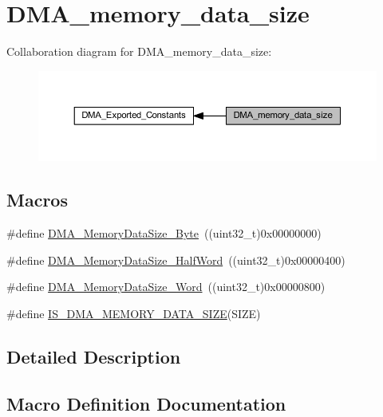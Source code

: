 \hypertarget{group___d_m_a__memory__data__size}{}\section{D\+M\+A\+\_\+memory\+\_\+data\+\_\+size}
\label{group___d_m_a__memory__data__size}
Collaboration diagram for D\+M\+A\+\_\+memory\+\_\+data\+\_\+size\+:
\nopagebreak
\begin{figure}[H]
\begin{center}
\leavevmode
\includegraphics[width=350pt]{group___d_m_a__memory__data__size}
\end{center}
\end{figure}
\subsection*{Macros}
\begin{DoxyCompactItemize}
\item 
\#define \hyperlink{group___d_m_a__memory__data__size_gad6093bccb60ff9adf81e21c73c58ba17}{D\+M\+A\+\_\+\+Memory\+Data\+Size\+\_\+\+Byte}~((uint32\+\_\+t)0x00000000)
\item 
\#define \hyperlink{group___d_m_a__memory__data__size_ga74c9b4e547f5eaaf35d4fd3d01ed5741}{D\+M\+A\+\_\+\+Memory\+Data\+Size\+\_\+\+Half\+Word}~((uint32\+\_\+t)0x00000400)
\item 
\#define \hyperlink{group___d_m_a__memory__data__size_gaff403722a6f82d4b34c9ef306507bb98}{D\+M\+A\+\_\+\+Memory\+Data\+Size\+\_\+\+Word}~((uint32\+\_\+t)0x00000800)
\item 
\#define \hyperlink{group___d_m_a__memory__data__size_gac9e3748cebcb16d4ae4206d562bc804c}{I\+S\+\_\+\+D\+M\+A\+\_\+\+M\+E\+M\+O\+R\+Y\+\_\+\+D\+A\+T\+A\+\_\+\+S\+I\+ZE}(S\+I\+ZE)
\end{DoxyCompactItemize}


\subsection{Detailed Description}


\subsection{Macro Definition Documentation}
\mbox{\label{group___d_m_a__memory__data__size_gad6093bccb60ff9adf81e21c73c58ba17}} 
